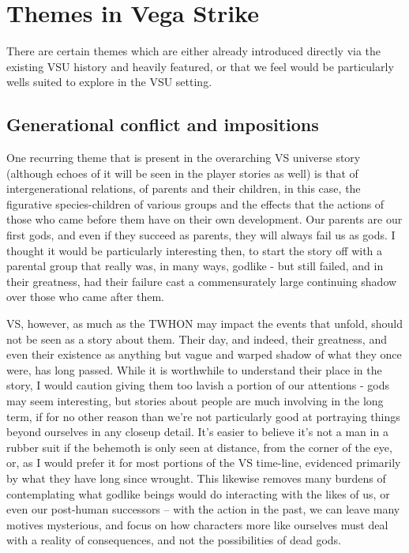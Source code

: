 \section{Themes in Vega Strike}
\label{sec:VSthemes}
There are certain themes which are either already introduced directly
via the existing VSU history and heavily featured, or that we feel
would be particularly wells suited to explore in the VSU setting.

\subsection{Generational conflict and impositions}
One recurring theme that is present in the overarching VS universe
story (although echoes of it will be seen in the player stories as
well) is that of intergenerational relations, of parents and their
children, in this case, the figurative species-children of various
groups and the effects that the actions of those who came before them
have on their own development. Our parents are our first gods, and
even if they succeed as parents, they will always fail us as gods. I
thought it would be particularly interesting then, to start the story
off with a parental group that really was, in many ways, godlike - but
still failed, and in their greatness, had their failure cast a
commensurately large continuing shadow over those who came after them.

VS, however, as much as the TWHON may impact the events that unfold,
should not be seen as a story about them. Their day, and indeed, their
greatness, and even their existence as anything but vague and warped
shadow of what they once were, has long passed. While it is worthwhile
to understand their place in the story, I would caution giving them
too lavish a portion of our attentions - gods may seem interesting,
but stories about people are much involving in the long term, if for
no other reason than we're not particularly good at portraying things
beyond ourselves in any closeup detail. It's easier to believe it's
not a man in a rubber suit if the behemoth is only seen at distance,
from the corner of the eye, or, as I would prefer it for most portions
of the VS time-line, evidenced primarily by what they have long since
wrought. This likewise removes many burdens of contemplating what
godlike beings would do interacting with the likes of us, or even our
post-human successors -- with the action in the past, we can leave
many motives mysterious, and focus on how characters more like
ourselves must deal with a reality of consequences, and not the
possibilities of dead gods.

